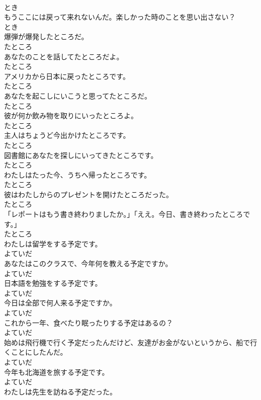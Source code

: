 \documentclass[8pt]{extreport}
\begin{document}
\begin{CJK}{UTF8}{min}
\\	とき
\\	もうここには戻って来れないんだ。楽しかった時のことを思い出さない？	
\\	とき
\\	爆弾が爆発したところだ。	
\\	たところ
\\	あなたのことを話してたところだよ。	
\\	たところ
\\	アメリカから日本に戻ったところです。	
\\	たところ
\\	あなたを起こしにいこうと思ってたところだ。	
\\	たところ
\\	彼が何か飲み物を取りにいったところよ。	
\\	たところ
\\	主人はちょうど今出かけたところです。	
\\	たところ
\\	図書館にあなたを探しにいってきたところです。	
\\	たところ
\\	わたしはたった今、うちへ帰ったところです。	
\\	たところ
\\	彼はわたしからのプレゼントを開けたところだった。	
\\	たところ
\\	「レポートはもう書き終わりましたか。」「ええ。今日、書き終わったところです。」	
\\	たところ
\\	わたしは留学をする予定です。	
\\	よていだ
\\	あなたはこのクラスで、今年何を教える予定ですか。	
\\	よていだ
\\	日本語を勉強をする予定です。	
\\	よていだ
\\	今日は全部で何人来る予定ですか。	
\\	よていだ
\\	これから一年、食べたり眠ったりする予定はあるの？	
\\	よていだ
\\	始めは飛行機で行く予定だったんだけど、友達がお金がないというから、船で行くことにしたんだ。	
\\	よていだ
\\	今年も北海道を旅する予定です。	
\\	よていだ
\\	わたしは先生を訪ねる予定だった。	

\end{CJK}
\end{document}
